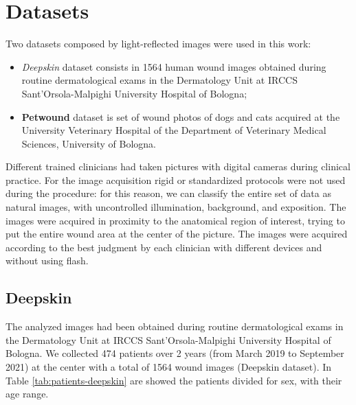 \documentclass[../main.tex]{subfiles}
\begin{document}
\section{Datasets}
Two datasets composed by light-reflected images  were used in this work: 
\begin{itemize}
    \item \textit{Deepskin} dataset consists in 1564 human wound images obtained during routine dermatological exams in the Dermatology Unit at IRCCS Sant’Orsola-Malpighi University Hospital of Bologna;
    \item \textbf{Petwound} dataset is set of wound photos of dogs and cats acquired  at the University Veterinary Hospital of the Department of Veterinary Medical Sciences, University of Bologna.
\end{itemize}
Different trained clinicians had taken pictures with digital cameras during clinical practice.
For the image acquisition rigid or standardized protocols were not used during the procedure: for this reason, we can classify the entire set of data as natural images, with uncontrolled illumination, background, and exposition.
The images were acquired in proximity to the anatomical region of interest, trying to put the entire wound area at the center of the picture. 
The images were acquired according to the best judgment by each clinician with different devices and without using flash.
\subsection{Deepskin}
The analyzed images had been obtained during routine dermatological exams in the Dermatology Unit at IRCCS Sant’Orsola-Malpighi University Hospital of Bologna. 
We collected 474 patients over 2 years (from March 2019 to September 2021) at the center with a total of 1564 wound images (Deepskin dataset).
In Table \ref{tab:patients-deepskin} are showed the patients divided for sex, with their age range.
\end{document}
